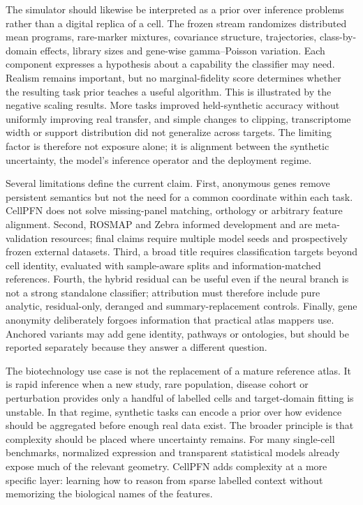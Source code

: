 \documentclass[12pt]{article}
\begin{document}
The simulator should likewise be interpreted as a prior over inference problems rather than a digital replica of a cell. The frozen stream randomizes distributed mean programs, rare-marker mixtures, covariance structure, trajectories, class-by-domain effects, library sizes and gene-wise gamma--Poisson variation. Each component expresses a hypothesis about a capability the classifier may need. Realism remains important, but no marginal-fidelity score determines whether the resulting task prior teaches a useful algorithm\cite{crowell2023shaky,duo2024simulation}. This is illustrated by the negative scaling results. More tasks improved held-synthetic accuracy without uniformly improving real transfer, and simple changes to clipping, transcriptome width or support distribution did not generalize across targets. The limiting factor is therefore not exposure alone; it is alignment between the synthetic uncertainty, the model’s inference operator and the deployment regime.

Several limitations define the current claim. First, anonymous genes remove persistent semantics but not the need for a common coordinate within each task. CellPFN does not solve missing-panel matching, orthology or arbitrary feature alignment. Second, ROSMAP and Zebra informed development and are meta-validation resources; final claims require multiple model seeds and prospectively frozen external datasets. Third, a broad title requires classification targets beyond cell identity, evaluated with sample-aware splits and information-matched references. Fourth, the hybrid residual can be useful even if the neural branch is not a strong standalone classifier; attribution must therefore include pure analytic, residual-only, deranged and summary-replacement controls. Finally, gene anonymity deliberately forgoes information that practical atlas mappers use. Anchored variants may add gene identity, pathways or ontologies, but should be reported separately because they answer a different question.

The biotechnology use case is not the replacement of a mature reference atlas. It is rapid inference when a new study, rare population, disease cohort or perturbation provides only a handful of labelled cells and target-domain fitting is unstable. In that regime, synthetic tasks can encode a prior over how evidence should be aggregated before enough real data exist. The broader principle is that complexity should be placed where uncertainty remains. For many single-cell benchmarks, normalized expression and transparent statistical models already expose much of the relevant geometry. CellPFN adds complexity at a more specific layer: learning how to reason from sparse labelled context without memorizing the biological names of the features.
\end{document}
